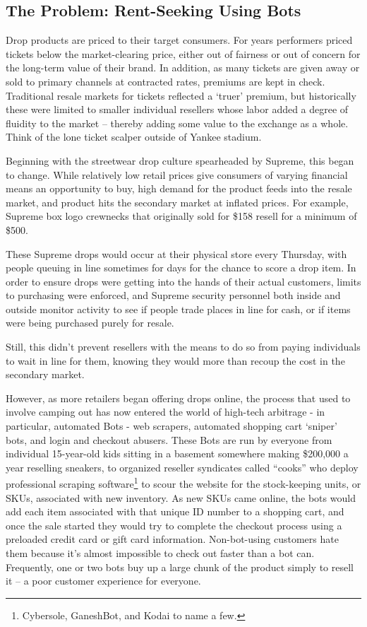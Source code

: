\documentclass[runningheads]{llncs}
\begin{document}
\subsection{The Problem: Rent-Seeking Using Bots} 
Drop products are priced to their target consumers.  For years performers priced tickets below the market-clearing price, either out of fairness or out of concern for the long-term value of their brand.\cite{bots-gifts-Hunt-2021}  In addition, as many tickets are given away or sold to primary channels at contracted rates, premiums are kept in check. Traditional resale markets for tickets reflected a ‘truer’ premium, but historically these were limited to smaller individual resellers whose labor added a degree of fluidity to the market – thereby adding some value to the exchange as a whole.  Think of the lone ticket scalper outside of Yankee stadium.

Beginning with the streetwear drop culture spearheaded by Supreme, this began to change.  While relatively low retail prices give consumers of varying financial means an opportunity to buy, high demand for the product feeds into the resale market, and product hits the secondary market at inflated prices. For example, Supreme box logo crewnecks that originally sold for \$158 resell for a minimum of \$500.\cite{streetwear-impact-SnR-2021}

These Supreme drops would occur at their physical store every Thursday, with people queuing in line sometimes for days for the chance to score a drop item.  In order to ensure drops were getting into the hands of their actual customers, limits to purchasing were enforced, and Supreme security personnel both inside and outside monitor activity to see if people trade places in line for cash, or if items were being purchased purely for resale.\cite{supreme-drop-FAZ-2021}

Still, this didn’t prevent resellers with the means to do so from paying individuals to wait in line for them, knowing they would more than recoup the cost in the secondary market.

However, as more retailers began offering drops online, the process that used to involve camping out has now entered the world of high-tech arbitrage - in particular, automated Bots - web scrapers, automated shopping cart ‘sniper’ bots, and login and checkout abusers.\cite{bots-gifts-Hunt-2021} These Bots are run by everyone from individual 15-year-old kids sitting in a basement somewhere making \$200,000 a year reselling sneakers, to organized reseller syndicates called “cooks” who deploy professional scraping software\footnote{Cybersole, GaneshBot, and Kodai to name a few.} to scour the website for the stock-keeping units, or SKUs, associated with new inventory. As new SKUs came online, the bots would add each item associated with that unique ID number to a shopping cart, and once the sale started they would try to complete the checkout process using a preloaded credit card or gift card information. Non-bot-using customers hate them because it’s almost impossible to check out faster than a bot can. Frequently, one or two bots buy up a large chunk of the product simply to resell it – a poor customer experience for everyone.\cite{bots-gifts-Hunt-2021}
\end{document}
